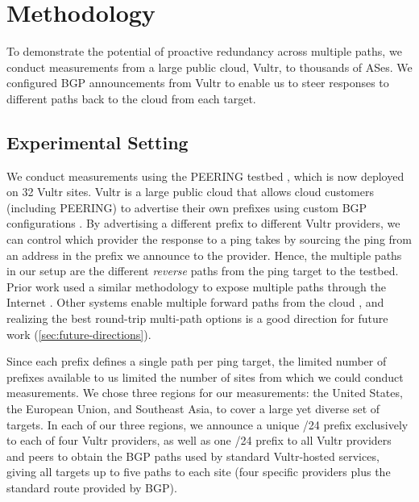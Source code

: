 \documentclass[sigconf,nonacm,screen,letterpaper,10pt]{acmart}
\begin{document}
\hypertarget{methodology}{%
\section{Methodology}\label{methodology}}

\label{sec:methodology}

To demonstrate the potential of proactive redundancy across multiple
paths, we conduct measurements from a large public cloud, Vultr, to
thousands of ASes. We configured BGP announcements from Vultr to enable
us to steer responses to different paths back to the cloud from each
target.

\hypertarget{experimental-setting}{%
\subsection{Experimental Setting}\label{experimental-setting}}

We conduct measurements using the PEERING testbed
\cite{schlinker19peering}, which is now deployed on 32 Vultr sites.
Vultr is a large public cloud that allows cloud customers (including
PEERING) to advertise their own prefixes using custom BGP configurations
\cite{vultr}. By advertising a different prefix to different Vultr
providers, we can control which provider the response to a ping takes by
sourcing the ping from an address in the prefix we announce to the
provider. Hence, the multiple paths in our setup are the different
\emph{reverse} paths from the ping target to the testbed. Prior work
used a similar methodology to expose multiple paths through the Internet
\cite{painter}. Other systems enable multiple forward paths from the
cloud \cite{edge-fabric,todd-cloud-latency}, and realizing the best
round-trip multi-path options is a good direction for future work
(\cref{sec:future-directions}).

Since each prefix defines a single path per ping target, the limited
number of prefixes available to us limited the number of sites from
which we could conduct measurements. We chose three regions for our
measurements: the United States, the European Union, and Southeast Asia,
to cover a large yet diverse set of targets. In each of our three
regions, we announce a unique /24 prefix exclusively to each of four
Vultr providers, as well as one /24 prefix to all Vultr providers and
peers to obtain the BGP paths used by standard Vultr-hosted services,
giving all targets up to five paths to each site (four specific
providers plus the standard route provided by BGP).
\end{document}
